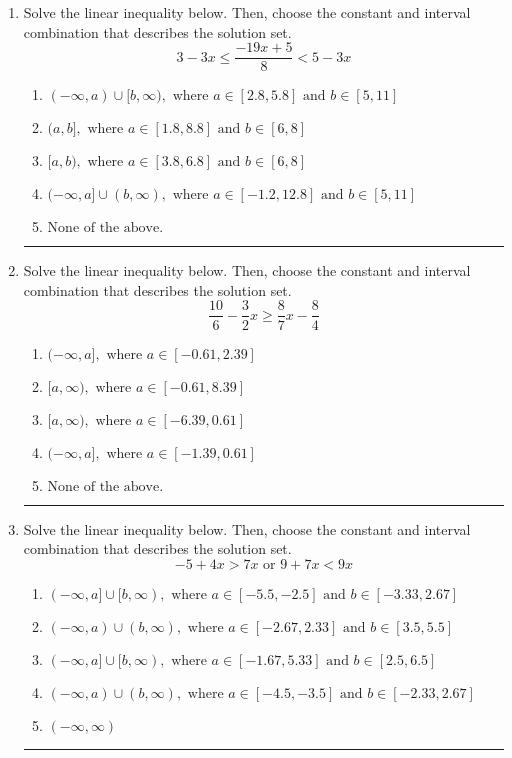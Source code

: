 \documentclass[14pt]{extbook}
\newcommand{\litem}[1]{\item#1\hspace*{-1cm}\rule{\textwidth}{0.4pt}}
\begin{document}
\begin{enumerate}
\litem{
Solve the linear inequality below. Then, choose the constant and interval combination that describes the solution set.\[ 3 - 3 x \leq \frac{-19 x + 5}{8} < 5 - 3 x \]\begin{enumerate}[label=\Alph*.]
\item \( (-\infty, a) \cup [b, \infty), \text{ where } a \in [2.8, 5.8] \text{ and } b \in [5, 11] \)
\item \( (a, b], \text{ where } a \in [1.8, 8.8] \text{ and } b \in [6, 8] \)
\item \( [a, b), \text{ where } a \in [3.8, 6.8] \text{ and } b \in [6, 8] \)
\item \( (-\infty, a] \cup (b, \infty), \text{ where } a \in [-1.2, 12.8] \text{ and } b \in [5, 11] \)
\item \( \text{None of the above.} \)

\end{enumerate} }
\litem{
Solve the linear inequality below. Then, choose the constant and interval combination that describes the solution set.\[ \frac{10}{6} - \frac{3}{2} x \geq \frac{8}{7} x - \frac{8}{4} \]\begin{enumerate}[label=\Alph*.]
\item \( (-\infty, a], \text{ where } a \in [-0.61, 2.39] \)
\item \( [a, \infty), \text{ where } a \in [-0.61, 8.39] \)
\item \( [a, \infty), \text{ where } a \in [-6.39, 0.61] \)
\item \( (-\infty, a], \text{ where } a \in [-1.39, 0.61] \)
\item \( \text{None of the above}. \)

\end{enumerate} }
\litem{
Solve the linear inequality below. Then, choose the constant and interval combination that describes the solution set.\[ -5 + 4 x > 7 x \text{ or } 9 + 7 x < 9 x \]\begin{enumerate}[label=\Alph*.]
\item \( (-\infty, a] \cup [b, \infty), \text{ where } a \in [-5.5, -2.5] \text{ and } b \in [-3.33, 2.67] \)
\item \( (-\infty, a) \cup (b, \infty), \text{ where } a \in [-2.67, 2.33] \text{ and } b \in [3.5, 5.5] \)
\item \( (-\infty, a] \cup [b, \infty), \text{ where } a \in [-1.67, 5.33] \text{ and } b \in [2.5, 6.5] \)
\item \( (-\infty, a) \cup (b, \infty), \text{ where } a \in [-4.5, -3.5] \text{ and } b \in [-2.33, 2.67] \)
\item \( (-\infty, \infty) \)


\end{enumerate}}
\end{enumerate}
\end{document}
